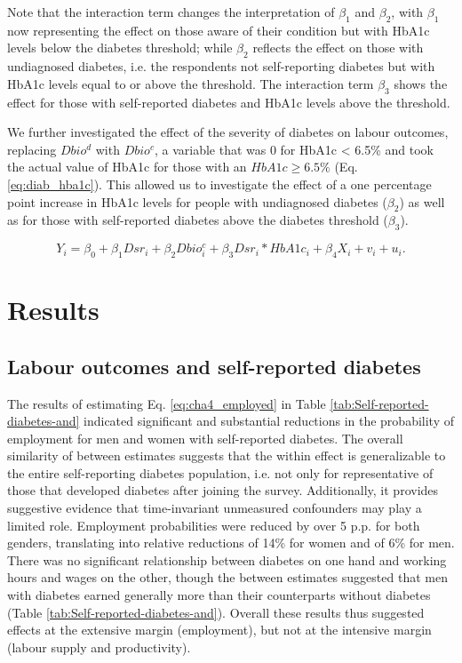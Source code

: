\documentclass[12pt,english]{article}
\begin{document}
Note that the interaction term changes the interpretation of $\beta_{1}$ and $\beta_{2}$, with $\beta_{1}$ now representing the effect on those aware of their condition but with \ac{HbA1c} levels below the diabetes threshold; while $\beta_{2}$ reflects the effect on those with undiagnosed diabetes, i.e. the respondents not self-reporting diabetes but with \ac{HbA1c} levels equal to or above the threshold. The interaction term $\beta_{3}$ shows the effect for those with self-reported diabetes and \ac{HbA1c} levels above the threshold.

We further investigated the effect of the severity of diabetes on labour outcomes, replacing $Dbio^{d}$ with $Dbio^{c}$, a variable that was $0$ for \ac{HbA1c} < 6.5\% and took the actual value of \ac{HbA1c} for those with an $HbA1c \geq 6.5\%$ (Eq. \ref{eq:diab_hba1c}). This allowed us to investigate the effect of a one percentage point increase in \ac{HbA1c} levels for people with undiagnosed diabetes ($\beta_{2}$) as well as for those with self-reported diabetes above the diabetes threshold ($\beta_{3}$).

\begin{equation}
Y_{i}=\beta_{0}+\beta_{1}Dsr_{i}+\beta_{2}Dbio^{c}_{i}+\beta_{3}Dsr_{i}*HbA1c_{i}+\beta_{4}X_{i}+v_{i}+u_{i}.\label{eq:diab_hba1c}
\end{equation}

\section{\label{sec:cha_4_results}Results}


\subsection{Labour outcomes and self-reported diabetes}

The results of estimating Eq. \ref{eq:cha4_employed} in Table \ref{tab:Self-reported-diabetes-and} indicated significant and substantial reductions in the probability of employment for men and women with self-reported diabetes. The overall similarity of between estimates suggests that the within effect is generalizable to the entire self-reporting diabetes population, i.e. not only for representative of those that developed diabetes after joining the survey. Additionally, it provides suggestive evidence that time-invariant unmeasured confounders may play a limited role. Employment probabilities were reduced by over 5 \ac{p.p.} for both genders, translating into relative reductions of 14\% for women and of 6\% for men. There was no significant relationship between diabetes on one hand and working hours and wages on the other, though the between estimates suggested that men with diabetes earned generally more than their counterparts without diabetes (Table \ref{tab:Self-reported-diabetes-and}). Overall these results thus suggested effects at the extensive margin (employment), but not at the intensive margin (labour supply and productivity). 
\end{document}
